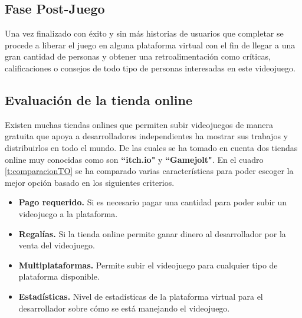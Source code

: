 \documentclass[a4paper, openright, 12pt]{report}
\begin{document}
\subsection{Fase Post-Juego}
\justify
Una vez finalizado con éxito y sin más historias de usuarios que completar se procede a liberar el juego en alguna plataforma virtual con el fin de llegar a una gran cantidad de personas y obtener una retroalimentación como críticas, calificaciones o consejos de todo tipo de personas interesadas en este videojuego.

\subsection*{Evaluación de la tienda online}
Existen muchas tiendas onlines que permiten subir videojuegos de manera gratuita que apoya a desarrolladores independientes ha mostrar sus trabajos y distribuirlos en todo el mundo. De las cuales se ha tomado en cuenta dos tiendas online muy conocidas como son \textbf{``itch.io"} y \textbf{``Gamejolt"}. En el cuadro \ref{t:comparacionTO} se ha comparado varias características para poder escoger la mejor opción basado en los siguientes criterios.

\begin{itemize}
\item \textbf{Pago requerido.} Si es necesario pagar una cantidad para poder subir un videojuego a la plataforma.
\item \textbf{Regalías.} Si la tienda online permite ganar dinero al desarrollador por la venta del videojuego. 
\item \textbf{Multiplataformas.} Permite subir el videojuego para cualquier tipo de plataforma disponible.
\item \textbf{Estadísticas.} Nivel de estadísticas de la plataforma virtual para el desarrollador sobre cómo se está manejando el videojuego.
\end{itemize}
\end{document}
